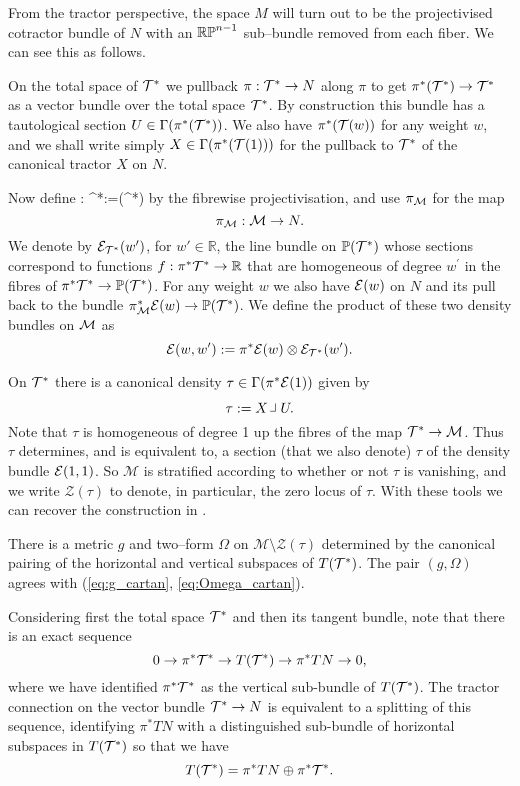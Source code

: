 From the tractor perspective, the space $M$ will turn out to be the projectivised cotractor bundle of $N$ with an $\mathbb{RP}^{n-1}$ sub--bundle removed from each fiber. We can see this as follows.

On the total space of $\mathcal{T}^*$ we pullback $\pi:\mathcal{T}^*\to N$ along $\pi$ to get $\pi^*(\mathcal{T}^*)\to \mathcal{T}^*$ as a vector bundle over the total space $\mathcal{T}^*$. By construction this bundle has a tautological section $U\in \Gamma (\pi^*(\mathcal{T}^*))$.  We also have $\pi^*(\mathcal{T}(w))$ for any weight $w$, and we shall write simply $X\in \Gamma(\pi^*(\mathcal{T}(1)))$ for the pullback to $\mathcal{T}^*$ of the canonical tractor $X$ on $N$.

Now define
\be
\label{projection_map}
\kappa: \cT^*\longrightarrow {}:=(\cT^*)
\ee
by the fibrewise projectivisation, and use $\pi_{\mathcal{M}}$ for the map
$$
\pi_{\mathcal{M}}:\mathcal{M}\to N.
$$
We denote by $\mathcal{E}_{\mathcal{T}^*}(w')$, for $w'\in \mathbb{R}$, the line
bundle on $\mathbb{P}(\mathcal{T}^*)$ whose sections correspond to functions
$f: \pi^*\mathcal{T}^* \to\mathbb{R} $ that are homogeneous of degree $w^\prime$ in
the fibres of $\pi^*\mathcal{T}^*\to \mathbb{P}(\mathcal{T}^*)$. For any weight $w$ we also have $\mathcal{E}(w)$ on $N$ and its pull back to the bundle $\pi_{\mathcal{M}}^*\mathcal{E}(w)\to \mathbb{P}(\mathcal{T}^*)$.
We define the product of these two density bundles on $\mathcal{M}$ as
$$
\mathcal{E}(w,w'):= \pi^*\mathcal{E}(w) \otimes \mathcal{E}_{\mathcal{T}^*}(w').
$$

On $\mathcal{T}^*$ there is  a canonical density $\tau\in \Gamma(\pi^*\mathcal{E}(1))$ given by
$$
\tau:= X\hook U .
$$
Note that $\tau$ is homogeneous of degree 1 up the fibres of the
map $\mathcal{T}^*\to \mathcal{M}$. Thus $\tau$ determines, and is equivalent
to, a section (that we also denote) $\tau$ of the density bundle $\mathcal{E}(1,1)$. So $\mathcal{M}$ is stratified according to
whether or not $\tau$ is vanishing, and we write $\mathcal{Z}(\tau)$
to denote, in particular, the zero locus of $\tau$. With these tools we can recover the construction in \cite{DM}.


\begin{theo}\cite{DGW}\label{metric} 
There is a metric $g$ and two--form $\Omega$ on $\mathcal{M}\setminus \mathcal{Z}(\tau)$ determined by the canonical pairing of the horizontal and vertical subspaces of $T(\mathcal{T}^*)$. The pair $(g,\Omega)$ agrees with (\ref{eq:g_cartan}, \ref{eq:Omega_cartan}).
\end{theo}
 Considering first the total space $\mathcal{T}^*$ and then its tangent
 bundle, note that there is an exact sequence
  \begin{equation}\label{TM}
0\to \pi^* \mathcal{T}^*\to T(\mathcal{T}^*)\to \pi^*TN\to 0,
  \end{equation}
  where we have identified $\pi^* \mathcal{T}^*$ as the vertical sub-bundle of $T(\mathcal{T}^*)$.
The tractor connection on the vector bundle $\mathcal{T}^*\to N$ is equivalent to a splitting of this sequence, identifying $\pi^*TN$ with a distinguished  sub-bundle of horizontal subspaces in 
$ T(\mathcal{T}^*)$ so that we have 
\begin{equation}\label{HV}
T(\mathcal{T}^*)=  \pi^*TN\oplus \pi^* \mathcal{T}^* .
\end{equation}

